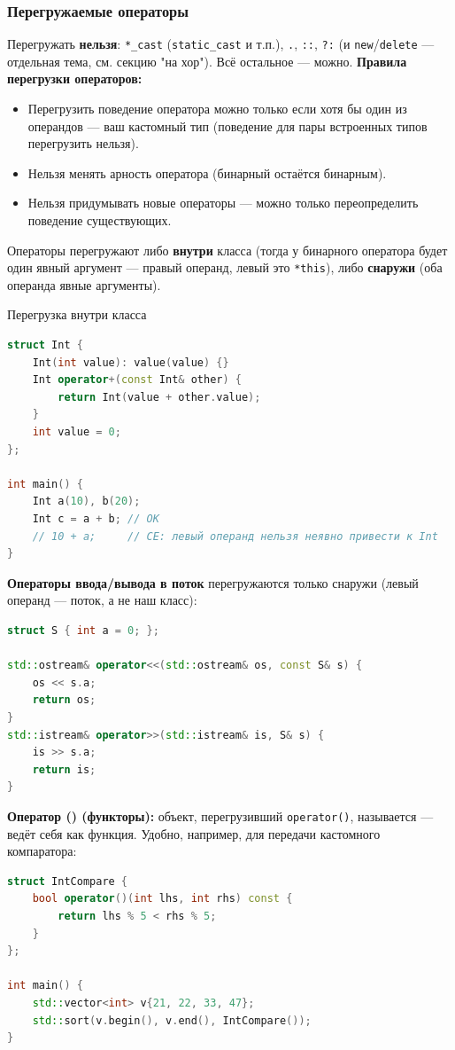 \subsubsection{Перегружаемые операторы}
Перегружать \textbf{нельзя}: \texttt{*\_cast} (\texttt{static\_cast} и т.п.), \texttt{.}, \texttt{::}, \texttt{?:} (и \texttt{new}/\texttt{delete} --- отдельная тема, см. секцию "на хор"). Всё остальное --- можно.
\textbf{Правила перегрузки операторов:}
\begin{itemize}
  \item Перегрузить поведение оператора можно только если хотя бы один из операндов --- ваш кастомный тип (поведение для пары встроенных типов перегрузить нельзя).
  \item Нельзя менять арность оператора (бинарный остаётся бинарным).
  \item Нельзя придумывать новые операторы --- можно только переопределить поведение существующих.
\end{itemize}
Операторы перегружают либо \textbf{внутри} класса (тогда у бинарного оператора будет один явный аргумент --- правый операнд, левый это \texttt{*this}), либо \textbf{снаружи} (оба операнда явные аргументы).
\begin{implementation}{Перегрузка внутри класса}{}
\begin{lstlisting}[language=C++]
struct Int {
    Int(int value): value(value) {}
    Int operator+(const Int& other) {
        return Int(value + other.value);
    }
    int value = 0;
};

int main() {
    Int a(10), b(20);
    Int c = a + b; // OK
    // 10 + a;     // CE: левый операнд нельзя неявно привести к Int
}
\end{lstlisting}
\end{implementation}
\textbf{Операторы ввода/вывода в поток} перегружаются только снаружи (левый операнд --- поток, а не наш класс):
\begin{lstlisting}[language=C++]
struct S { int a = 0; };

std::ostream& operator<<(std::ostream& os, const S& s) {
    os << s.a;
    return os;
}
std::istream& operator>>(std::istream& is, S& s) {
    is >> s.a;
    return is;
}
\end{lstlisting}
\textbf{Оператор () (функторы):} объект, перегрузивший \texttt{operator()}, называется  --- ведёт себя как функция. Удобно, например, для передачи кастомного компаратора:
\begin{lstlisting}[language=C++]
struct IntCompare {
    bool operator()(int lhs, int rhs) const {
        return lhs % 5 < rhs % 5;
    }
};

int main() {
    std::vector<int> v{21, 22, 33, 47};
    std::sort(v.begin(), v.end(), IntCompare());
}
\end{lstlisting}
